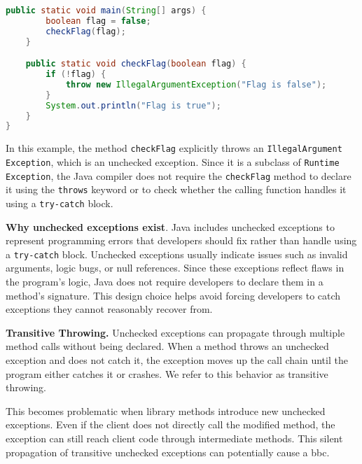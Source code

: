 \begin{itemize}
\begin{lstlisting}[language=java]
    public static void main(String[] args) {
        boolean flag = false;
        checkFlag(flag);
    }

    public static void checkFlag(boolean flag) {
        if (!flag) {
            throw new IllegalArgumentException("Flag is false");
        }
        System.out.println("Flag is true");
    }
}
    \end{lstlisting}
    In this example, the method \texttt{checkFlag} explicitly throws an \texttt{IllegalArgument\\Exception},
    which is an unchecked exception. Since it is a subclass of \texttt{Runtime\\Exception}, the Java compiler
    does not require the \texttt{checkFlag} method to declare it using the \texttt{throws} keyword or
    to check whether the calling function handles it using a \texttt{try-catch} block.
\end{itemize}

\textbf{Why unchecked exceptions exist}. Java includes unchecked exceptions to represent programming errors that developers should fix rather than handle using a \texttt{try-catch} block. Unchecked exceptions usually indicate issues such as invalid arguments, logic bugs, or null references. Since these exceptions reflect flaws in the program's logic, Java does not require developers to declare them in a method’s signature. This design choice helps avoid forcing developers to catch exceptions they cannot reasonably recover from.

\textbf{Transitive Throwing.} Unchecked exceptions can propagate through multiple method calls without being declared. When a method throws an unchecked exception and does not catch it, the exception moves up the call chain until the program either catches it or crashes. We refer to this behavior as transitive throwing.

This becomes problematic when library methods introduce new unchecked exceptions. Even if the client does not directly call the modified method, the exception can still reach client code through intermediate methods. This silent propagation of transitive unchecked exceptions can potentially cause a \gls{bbc}.


